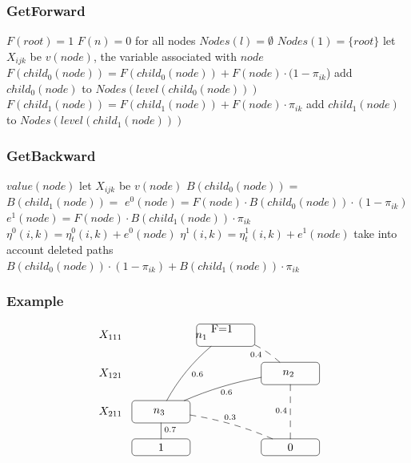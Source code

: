 \documentclass[trans,aspectratio=1610]{beamer}
\begin{document}
\begin{frame}
 \frametitle{GetForward}
 \begin{scriptsize}
\begin{algorithmic}[1]
\State $F(root)=1$
\State $F(n)=0$ for all nodes
\State $Nodes(l)=\emptyset$
\EndFor
\State $Nodes(1)=\{root\}$
\State let $X_{ijk}$ be $v(node)$, the variable associated with $node$
\State $F(child_0(node))=F(child_0(node))+F(node)\cdot(1-\pi_{ik}$)
\State add $child_0(node)$ to $Nodes(level(child_0(node)))$
\EndIf
{}
\State $F(child_1(node))=F(child_1(node))+F(node)\cdot\pi_{ik}$
\State add $child_1(node)$ to $Nodes(level(child_1(node)))$
\EndIf
\EndFor
\EndFor
\EndProcedure
\end{algorithmic}
\end{scriptsize}
\end{frame}

\begin{frame}
 \frametitle{GetBackward}
  \begin{scriptsize}
\begin{algorithmic}[1]
\State \Return $value(node)$
\Else
\State let $X_{ijk}$ be $v(node)$
\State $B(child_0(node))=$
\State $B(child_1(node))=$
\State $e^{0}(node)=F(node)\cdot B(child_0(node))\cdot(1-\pi_{ik})$
\State $e^{1}(node)=F(node)\cdot B(child_1(node))\cdot\pi_{ik}$
\State $\eta^{0}(i,k)=\eta_t^{0}(i,k)+e^{0}(node)$
\State $\eta^{1}(i,k)=\eta_t^{1}(i,k)+e^{1}(node)$
\State take into account deleted paths
\State \Return $B(child_0(node))\cdot(1-\pi_{ik}) + B(child_1(node))\cdot\pi_{ik}$
\EndIf
\EndFunction
\end{algorithmic}
\end{scriptsize}
\end{frame}

\begin{frame}
 \frametitle{Example}
   \begin{scriptsize}
$$\xymatrix@R=5mm@C=2mm
{ X_{111} & &*=<52pt,20pt>[F-:<3pt>]{n_1\ \parbox{40pt}{F=1\\
}}
\ar@/_/@{-}[ldd]^{0.6} \ar@/^/@{--}[dr]_{0.4}\\ 
X_{121}  & & &*=<52pt,20pt>[F-:<3pt>]{n_2\ \parbox{36pt}{}} 
\ar@/_/@{-}[dll]^{0.6}\ar@{--}[dd] _{0.4}
\\
X_{211}& *=<52pt,20pt>[F-:<3pt>]{n_3\ \parbox{35pt}{}}
\ar@{-}[d]^{0.7} \ar@/^/@{--}[drr]^{0.3}  \\
&*=<52pt,15pt>[F-:<3pt>]{1} &&*=<52pt,15pt>[F-:<3pt>]{0}}
$$
\end{scriptsize}
\end{frame}
\end{document}
